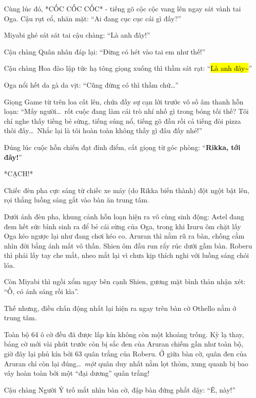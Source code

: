 \documentclass[../main.tex]{subfiles}
\begin{document}
Cùng lúc đó, *CỐC CỐC CỐC* - tiếng gõ cộc cộc vang lên ngay sát vành tai Oga. Cậu rụt cổ, nhăn mặt: ``Ai đang cục cục cái gì đấy?''

Miyabi ghé sát sát tai cậu chàng: ``Là anh đây!''

Cậu chàng Quân nhân đáp lại: ``Đừng có hét vào tai em như thế!''

Cậu chàng Hoa đào lập tức hạ tông giọng xuống thì thầm sát rạt: ``\hl{Là anh đây\~{}}''

Oga nổi hết da gà da vịt: ``Cũng đừng có thì thầm chứ\dots''

Giọng Game từ trên loa cất lên, chứa đầy sự cạn lời trước vô số âm thanh hỗn loạn: ``Mấy người\dots\ rốt cuộc đang làm cái trò nhí nhố gì trong bóng tối thế? Tôi chỉ nghe thấy tiếng bẻ sừng, tiếng súng nổ, tiếng gõ đầu rồi cả tiếng đòi pizza thôi đấy\dots\ Nhắc lại là tôi hoàn toàn không thấy gì đâu đấy nhé!''

Đúng lúc cuộc hỗn chiến đạt đỉnh điểm, cất giọng từ góc phòng: ``\textbf{Rikka, tới đây!}''

*CẠCH!*

Chiếc đèn pha cực sáng từ chiếc xe máy (do Rikka biến thành) đột ngột bật lên, rọi thẳng luồng sáng gắt vào bàn ăn trung tâm.

Dưới ánh đèn pha, khung cảnh hỗn loạn hiện ra vô cùng sinh động: Astel đang đem hết sức bình sinh ra để bẻ cái sừng của Oga, trong khi Izuru ôm chặt lấy Oga kéo ngược lại như đang chơi kéo co. Aruran thì nằm rũ ra bàn, chống cằm nhìn đời bằng ánh mắt vô thần. Shien ôm đầu run rẩy rúc dưới gầm bàn. Roberu thì phải lấy tay che mắt, nheo mắt lại vì chưa kịp thích nghi với luồng sáng chói lóa.


Còn Miyabi thì ngồi xổm ngay bên cạnh Shien, gương mặt bình thản nhận xét: ``Ồ, có ánh sáng rồi kìa''.

Thế nhưng, điều chấn động nhất lại hiện ra ngay trên bàn cờ Othello nằm ở trung tâm.

Toàn bộ 64 ô cờ đều đã được lấp kín không còn một khoảng trống. Kỳ lạ thay, bảng cờ mới vài phút trước còn bị sắc đen của Aruran chiếm gần như toàn bộ, giờ đây lại phủ kín bởi 63 quân trắng của Roberu. Ở giữa bàn cờ, quân đen của Aruran chỉ còn lại đúng\dots\ \emph{một} quân duy nhất nằm lọt thỏm, xung quanh bị bao vây hoàn toàn bởi một ``đại dương'' quân trắng!


Cậu chàng Người Ý trố mắt nhìn bàn cờ, đập bàn đứng phắt dậy: ``Ê, này!''
\end{document}
